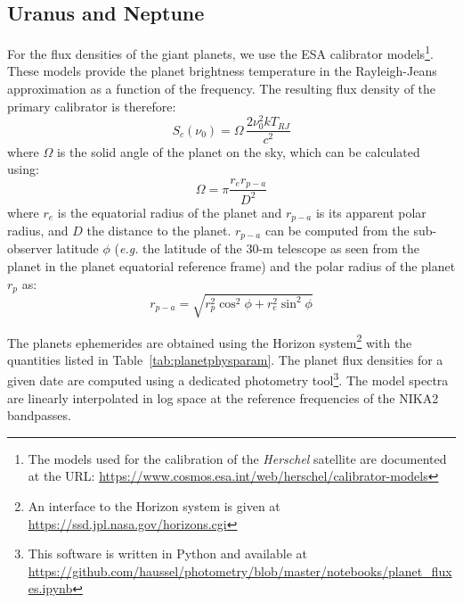 %


\subsection{Uranus and Neptune}
\label{se:ref_flux_uranus_neptune}

For the flux densities of the giant planets, we use the ESA calibrator models\footnote{The models used for the calibration of the \emph{Herschel} satellite are documented at the URL: \url{https://www.cosmos.esa.int/web/herschel/calibrator-models}}.
These models provide the planet brightness temperature in the
Rayleigh-Jeans approximation as a function of the frequency. The
resulting flux density of the primary calibrator is therefore: 
\begin{equation}
S_c(\nu_0) = \Omega \, \frac{2 \nu_0^{2} k T_{RJ}}{c^2}
\end{equation}
where $\Omega$ is the solid angle of the planet on the sky, %
which can be calculated using:
%
\begin{equation}
\Omega = \pi \frac{r_{e} r_{p-a}}{D^{2}} 
\label{eq:omega}
\end{equation}
where $r_{e}$ is the equatorial radius of the planet and $r_{p-a}$ is
its apparent polar radius, and $D$ the distance to the
planet. $r_{p-a}$ can be computed from the sub-observer latitude $\phi$
({\it e.g.} the latitude of the 30-m telescope as seen from the planet in the
planet equatorial reference frame) and the polar radius of the
planet $r_{p}$ as:
\begin{equation}
r_{p-a} = \sqrt{r_{p}^2 \cos^{2}\phi + r_{e}^2 \sin^{2} \phi}
\end{equation}

The planets ephemerides are obtained using the
Horizon system\footnote{An interface to the Horizon system is given at \url{https://ssd.jpl.nasa.gov/horizons.cgi}} with the quantities
listed in Table~\ref{tab:planetphysparam}. The planet flux densities for a given date are computed using a dedicated
photometry tool\footnote{This software is written in Python and available at \url{https://github.com/haussel/photometry/blob/master/notebooks/planet_fluxes.ipynb}}. The model spectra are linearly interpolated in log space at the
reference frequencies of the NIKA2 bandpasses. %

